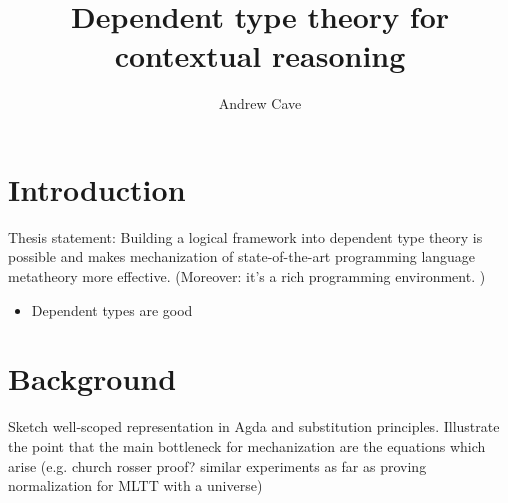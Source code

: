 \documentclass{article}
\author{Andrew Cave}
\title{Dependent type theory for contextual reasoning}
\begin{document}
\maketitle

\section{Introduction}
Thesis statement: Building a logical framework into dependent type
theory is possible and makes mechanization of state-of-the-art programming
language metatheory more effective. (Moreover: it's a rich programming
environment. %
)

\begin{itemize}
\item Dependent types are good
\end{itemize}

\section{Background}
Sketch well-scoped representation in Agda and substitution
principles. Illustrate the point that the main bottleneck for
mechanization are the equations which arise (e.g. church rosser proof?
similar experiments as far as proving normalization for MLTT with a universe)
\end{document}
